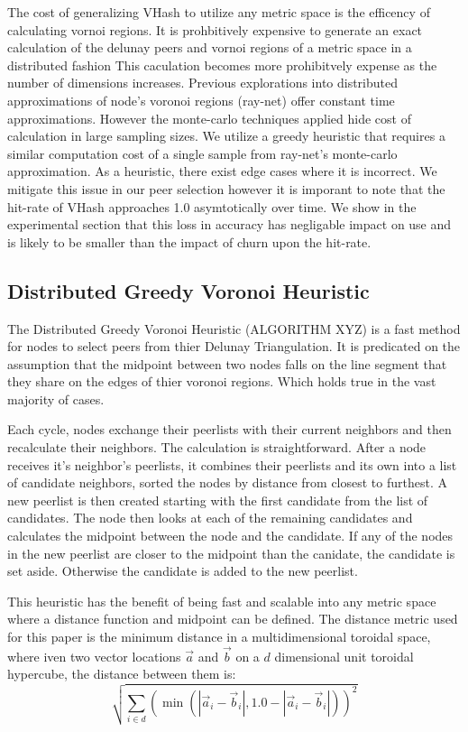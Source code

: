 \documentclass{IEEEtran}
\begin{document}
The cost of generalizing VHash to utilize any metric space is the efficency of calculating vornoi regions. It is prohbitively expensive to generate an exact calculation of the delunay peers and vornoi regions of a metric space in a distributed fashion\cite{raynet}%
This caculation becomes more prohibitvely expense as the number of dimensions increases. Previous explorations into distributed approximations of node's voronoi regions (ray-net) offer constant time approximations. However the monte-carlo techniques applied hide cost of calculation in large sampling sizes. We utilize a greedy heuristic that requires a similar computation cost of a single sample from ray-net's monte-carlo approximation. As a heuristic, there exist edge cases where it is incorrect. We mitigate this issue in our peer selection however it is imporant to note that the hit-rate of VHash approaches 1.0 asymtotically over time. We show in the experimental section that this loss in accuracy has negligable impact on use and is likely to be smaller than the impact of churn upon the hit-rate.

\subsection{Distributed Greedy Voronoi Heuristic}
The Distributed Greedy Voronoi Heuristic (ALGORITHM XYZ) is a fast method for nodes to select peers from thier Delunay Triangulation. It is predicated on the assumption that the midpoint between two nodes falls on the line segment that they share on the edges of thier voronoi regions. Which holds true in the vast majority of cases.

Each cycle, nodes exchange their peerlists with their current neighbors and then recalculate their neighbors.  
The calculation is straightforward.
After a node receives it's neighbor's peerlists, it combines their peerlists and its own into a list of candidate neighbors, sorted the nodes by distance from closest to furthest.
A new peerlist is then created starting with the first candidate from the list of candidates.
The node then looks at each of the remaining candidates and calculates the midpoint between the node and the candidate.
If any of the nodes in the new peerlist are closer to the midpoint than the canidate, the candidate is set aside.  Otherwise the candidate is added to the new peerlist.

This heuristic has the benefit of being fast and scalable into any metric space where a distance function and midpoint can be defined.
The distance metric used for this paper is the minimum distance in a multidimensional toroidal space, where iven two vector locations $\vec{a}$ and $\vec{b}$ on a $d$ dimensional unit toroidal hypercube, the distance between them is: %
\[  \sqrt{\sum\limits_{i\in d} (\min(|\vec{a}_i-\vec{b}_i|, 1.0-|\vec{a}_i-\vec{b}_i|))^2}\]
\end{document}
